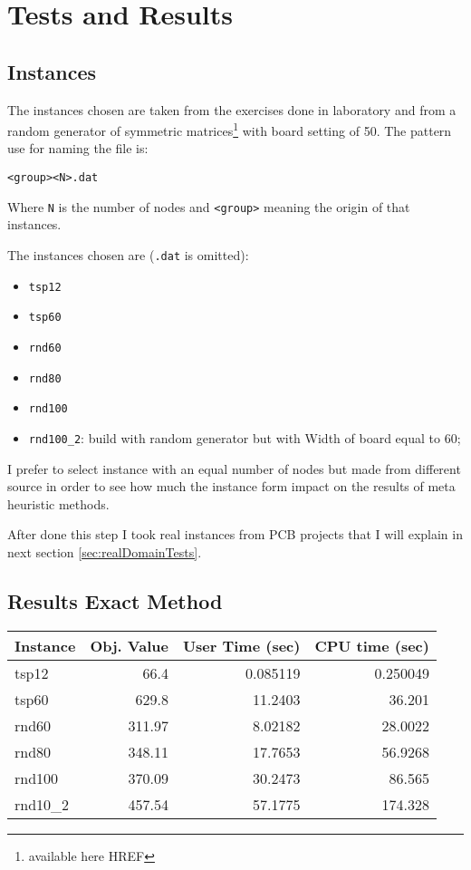 \section{Tests and Results}

\subsection{Instances}
	The instances chosen are taken from the exercises done in laboratory and from a random generator of symmetric matrices\footnote{available here HREF} with board setting of 50. The pattern use for naming the file is:
	\begin{center}
		\verb|<group><N>.dat|
	\end{center}
	Where \verb|N| is the number of nodes and \verb|<group>| meaning the origin of that instances.
	
	The instances chosen are (\verb|.dat| is omitted):
	\begin{itemize}
		\item \verb|tsp12|
		\item \verb|tsp60|
		\item \verb|rnd60|
		\item \verb|rnd80|
		\item \verb|rnd100|
		\item \verb|rnd100_2|: build with random generator but with Width of board equal to 60;
	\end{itemize}
	I prefer to select instance with an equal number of nodes but made from different source in order to see how much the instance form impact on the results of meta heuristic methods.
	
	After done this step I took real instances from PCB projects that I will explain in next section \ref{sec:realDomainTests}. 

\subsection{Results Exact Method}

	\begin{center}
		\begin{tabular}{lrrr}
			\toprule
			\textbf{Instance} & \textbf{Obj. Value} & \textbf{User Time (sec)} & \textbf{CPU time (sec)} \\
			\midrule
			tsp12 & 66.4 & 0.085119 & 0.250049 \\
			tsp60 & 629.8 & 11.2403 & 36.201 \\
			
			rnd60 & 311.97 & 8.02182 & 28.0022 \\
			rnd80 & 348.11 & 17.7653 & 56.9268 \\
			rnd100 & 370.09 & 30.2473 & 86.565 \\
			rnd10\_2 & 457.54 & 57.1775 & 174.328 \\
			\bottomrule
		\end{tabular}
	\end{center}
	

